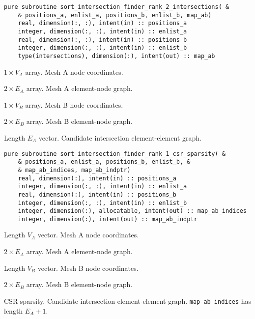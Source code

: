 \documentclass{article}
\begin{document}
\begin{lstlisting}[language=FORTRAN]
  pure subroutine sort_intersection_finder_rank_2_intersections( &
    & positions_a, enlist_a, positions_b, enlist_b, map_ab)
    real, dimension(:, :), intent(in) :: positions_a
    integer, dimension(:, :), intent(in) :: enlist_a
    real, dimension(:, :), intent(in) :: positions_b
    integer, dimension(:, :), intent(in) :: enlist_b
    type(intersections), dimension(:), intent(out) :: map_ab
\end{lstlisting}

\begin{description}[font=\ttfamily\bfseries,leftmargin=2.2\parindent,labelindent=1.7\parindent,noitemsep]
  \item[positions\_a] $1 \times V_A$ array. Mesh A node coordinates.
  \item[enlist\_a] $2 \times E_A$ array. Mesh A element-node graph.
  \item[positions\_b] $1 \times V_B$ array. Mesh B node coordinates.
  \item[enlist\_b] $2 \times E_B$ array. Mesh B element-node graph.
  \item[map\_ab] Length $E_A$ vector. Candidate intersection element-element
    graph.
\end{description}

\begin{lstlisting}[language=FORTRAN]
  pure subroutine sort_intersection_finder_rank_1_csr_sparsity( &
    & positions_a, enlist_a, positions_b, enlist_b, &
    & map_ab_indices, map_ab_indptr)
    real, dimension(:), intent(in) :: positions_a
    integer, dimension(:, :), intent(in) :: enlist_a
    real, dimension(:), intent(in) :: positions_b
    integer, dimension(:, :), intent(in) :: enlist_b
    integer, dimension(:), allocatable, intent(out) :: map_ab_indices
    integer, dimension(:), intent(out) :: map_ab_indptr
\end{lstlisting}

\begin{description}[font=\ttfamily\bfseries,leftmargin=2.2\parindent,labelindent=1.7\parindent,noitemsep]
  \item[positions\_a] Length $V_A$ vector. Mesh A node coordinates.
  \item[enlist\_a] $2 \times E_A$ array. Mesh A element-node graph.
  \item[positions\_b] Length $V_B$ vector. Mesh B node coordinates.
  \item[enlist\_b] $2 \times E_B$ array. Mesh B element-node graph.
  \item[map\_ab\_indices, map\_ab\_indptr] CSR sparsity. Candidate intersection
    element-element graph. \linebreak \verb+map_ab_indices+ has length
    $E_A + 1$.
\end{description}
\end{document}
